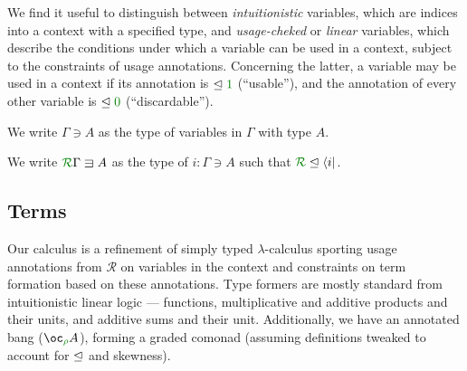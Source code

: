 \documentclass[submission,copyright,creativecommons]{eptcs}
\begin{document}
We find it useful to distinguish between \emph{intuitionistic} variables, which
are indices into a context with a specified type, and \emph{usage-cheked} or
\emph{linear} variables, which describe the conditions under which a variable
can be used in a context, subject to the constraints of usage annotations.
Concerning the latter, a variable may be used in a context if its annotation is
$\subres \rescomment 1$ (``usable''), and the annotation of every other variable
is $\subres \rescomment 0$ (``discardable'').

\begin{definition}
  We write $\Gamma \ni A$ as the type of variables in $\Gamma$ with type $A$.
\end{definition}

\begin{definition}
  We write $\ctx{\Gamma}{R} \lvar A$ as the type of $i : \Gamma \ni A$ such that
  $\resctx R \subres \langle i \rvert$.
\end{definition}

\subsection{Terms}

Our calculus is a refinement of simply typed $\lambda$-calculus sporting usage
annotations from $\mathscr R$ on variables in the context and constraints on
term formation based on these annotations.
Type formers are mostly standard from intuitionistic linear logic --- functions,
multiplicative and additive products and their units, and additive sums and
their unit.
Additionally, we have an annotated bang ($\excl{\rho}{A}$), forming a graded
comonad (assuming definitions tweaked to account for $\trianglelefteq$ and skewness).
\end{document}
